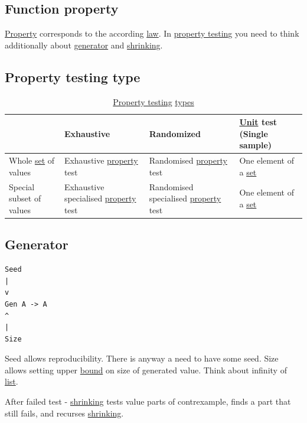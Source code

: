 \documentclass[a4paper,14pt,oneside]{book}
\begin{document}
\subsection{\label{orgc1075c9}Function property}
\label{sec:org32b5c9d}

\hyperref[orgcd82c84]{Property} corresponds to the according \hyperref[orgc42595d]{law}.
In \hyperref[orgbf37195]{property testing} you need to think additionally about \hyperref[orgc680a74]{generator} and \hyperref[org683eb8e]{shrinking}.

\subsection{\label{org1160ab9}Property testing type}
\label{sec:org6563c99}

\begin{table}[htbp]
\caption{\label{tab--property-testing-type}\hyperref[orgbf37195]{Property testing} \hyperref[orga3bdd72]{types}}
\centering
\begin{tabu} spread \linewidth {llll}
\toprule
 & Exhaustive & Randomized & \hyperref[orgbf79620]{Unit} test (Single sample)\\
\midrule
Whole \hyperref[orgb802935]{set} of values & Exhaustive \hyperref[orgcd82c84]{property} test & Randomised \hyperref[orgcd82c84]{property} test & One element of a \hyperref[orgb802935]{set}\\
Special subset of values & Exhaustive specialised \hyperref[orgcd82c84]{property} test & Randomised specialised \hyperref[orgcd82c84]{property} test & One element of a \hyperref[orgb802935]{set}\\
\bottomrule
\end{tabu}
\end{table}

\subsection{\label{orgc680a74}Generator}
\label{sec:org2401c97}
\begin{verbatim}
Seed
|
v
Gen A -> A
^
|
Size
\end{verbatim}

Seed allows reproducibility.
There is anyway a need to have some seed.
Size allows setting upper \hyperref[org327c189]{bound} on size of generated value. Think about infinity of \hyperref[orgf1a1d56]{list}.

After failed test - \hyperref[org683eb8e]{shrinking} tests value parts of contrexample, finds a part that still fails, and recurses \hyperref[org683eb8e]{shrinking}.
\end{document}

